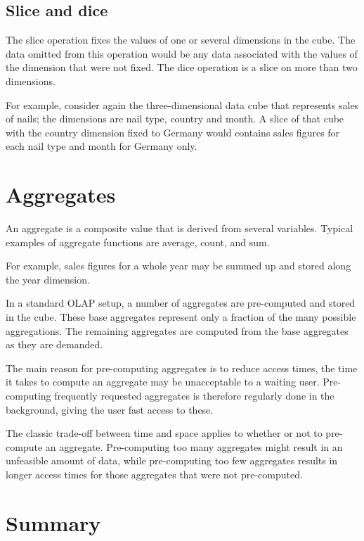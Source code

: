 \subsection{Slice and dice}

The slice operation fixes the values of one or several dimensions in the cube.
The data omitted from this operation would be any data associated with the
values of the dimension that were not fixed. The dice operation is a slice on
more than two dimensions.

For example, consider again the three-dimensional data cube that represents
sales of nails; the dimensions are nail type, country and month. A slice of
that cube with the country dimension fixed to Germany would contains sales
figures for each nail type and month for Germany only.


\section{Aggregates}

An aggregate is a composite value that is derived from several variables.
Typical examples of aggregate functions are average, count, and sum.

For example, sales figures for a whole year may be summed up and stored along
the year dimension.

In a standard OLAP setup, a number of aggregates are pre-computed and
stored in the cube. These base aggregates represent only a fraction of the
many possible aggregations. The remaining aggregates are computed from the
base aggregates as they are demanded.

The main reason for pre-computing aggregates is to reduce access times, the
time it takes to compute an aggregate may be unacceptable to a waiting
user. Pre-computing frequently requested aggregates is therefore regularly
done in the background, giving the user fast access to these.
\cite{olap_solutions}

The classic trade-off between time and space applies to whether or not to
pre-compute an aggregate. Pre-computing too many aggregates might result in an
unfeasible amount of data, while pre-computing too few aggregates results in
longer access times for those aggregates that were not pre-computed.


\section{Summary}

